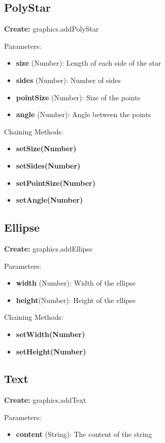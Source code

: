 \documentclass{article}
\begin{document}
\subsection{PolyStar}
\textbf{Create:} graphics.addPolyStar

Parameters:
\begin{itemize}
\item \textbf{size} (Number): Length of each side of the star
\item \textbf{sides} (Number): Number of sides
\item \textbf{pointSize} (Number): Size of the points
\item \textbf{angle} (Number): Angle between the points
\end{itemize}

Chaining Methods:
\begin{itemize}
\item \textbf{setSize(Number)} 
\item \textbf{setSides(Number)} 
\item \textbf{setPointSize(Number)} 
\item \textbf{setAngle(Number)}
\end{itemize}

\subsection{Ellipse}
\textbf{Create:} graphics.addEllipse

Parameters:
\begin{itemize}
\item \textbf{width} (Number): Width of the ellipse
\item \textbf{height}(Number): Height of the ellipse
\end{itemize}

Chaining Methods:
\begin{itemize}
\item \textbf{setWidth(Number)} 
\item \textbf{setHeight(Number)}
\end{itemize}

\subsection{Text}
\textbf{Create:} graphics.addText

Parameters:
\begin{itemize}
\item \textbf{content} (String): The content of the string
\end{itemize}
\end{document}
